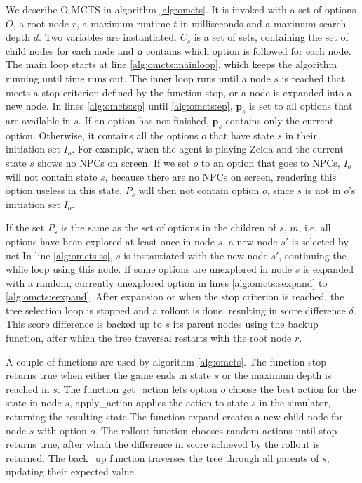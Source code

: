 We describe O-MCTS in algorithm \ref{alg:omcts}. It is invoked with a set of
options $O$, a root node $r$, a maximum runtime $t$ in milliseconds and a
maximum search depth $d$. Two variables are instantiated. $C_s$ is a set of
sets, containing the set of child nodes for each node and $\mathbf{o}$ contains
which option is followed for each node. The main loop starts at line
\ref{alg:omcts:mainloop}, which keeps the algorithm running until time runs out.
The inner loop runs until a node $s$ is reached that meets a stop criterion
defined by the function \textsf{stop}, or a node is expanded into a new node.
In lines \ref{alg:omcts:sp} until \ref{alg:omcts:ep}, $\mathbf{p}_s$ is set to
all options that are available in $s$. If an option has not finished,
$\mathbf{p}_s$ contains only the current option. Otherwise, it contains all the options $o$ that have state $s$ in their
initiation set $I_o$. For example, when the agent is playing Zelda and the current
state $s$ shows no NPCs on screen. If we set $o$ to an option that goes to NPCs,
$I_o$ will not contain state $s$, because there are no NPCs on screen, rendering
this option useless in this state. $P_s$ will then not contain option $o$, since
$s$ is not in $o$'s initiation set $I_o$.

If the set $P_s$ is the same as the set of options in the children of $s$,
$m$, i.e. all options have been explored at least once in node $s$, a new node $s'$ is
selected by \textsf{uct} In line
\ref{alg:omcts:ss}, $s$ is instantiated with the new node $s'$, continuing the
while loop using this node. If some options are unexplored in node $s$ is
expanded with a random, currently unexplored option in lines \ref{alg:omcts:sexpand} to
\ref{alg:omcts:eexpand}. After expansion or when the stop criterion is reached,
the tree selection loop is stopped and a rollout is done, resulting in score
difference $\delta$. This score difference is backed up to $s$ its parent nodes
using the backup function, after which the tree traversal restarts with the root
node $r$.

A couple of functions are used by algorithm \ref{alg:omcts}. The function
\textsf{stop} returns true when either the game ends in state $s$ or the maximum
depth is reached in $s$. The function \textsf{get\_action} lets option $o$
choose the best action for the state in node $s$, \textsf{apply\_action} applies
the action to state $s$ in the simulator, returning the resulting state.The
function \textsf{expand} creates a new child node for node $s$ with option $o$.
The \textsf{rollout} function chooses random actions until \textsf{stop} returns
true, after which the difference in score achieved by the rollout is returned.
The \textsf{back\_up} function traverses the tree through all parents of $s$,
updating their expected value.

